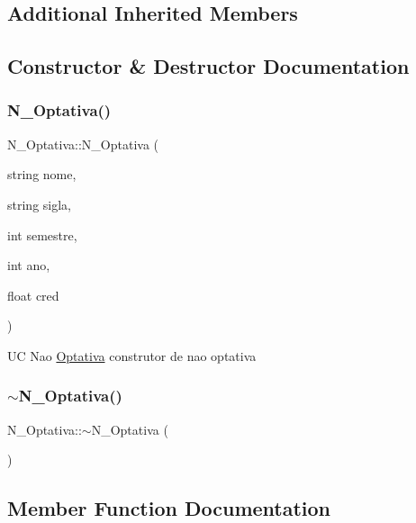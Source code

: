 \subsection*{Additional Inherited Members}


\subsection{Constructor \& Destructor Documentation}
\hypertarget{class_n___optativa_a9c0103c5330eaaebeb37a5236014345c}{}\label{class_n___optativa_a9c0103c5330eaaebeb37a5236014345c} 
\subsubsection{\texorpdfstring{N\+\_\+\+Optativa()}{N\_Optativa()}}
{\footnotesize\ttfamily N\+\_\+\+Optativa\+::\+N\+\_\+\+Optativa (\begin{DoxyParamCaption}\item[{string}]{nome,  }\item[{string}]{sigla,  }\item[{int}]{semestre,  }\item[{int}]{ano,  }\item[{float}]{cred }\end{DoxyParamCaption})}

UC Nao \hyperlink{class_optativa}{Optativa} construtor de nao optativa \hypertarget{class_n___optativa_a9cdbfb651fba33a1716e022c38e15d62}{}\label{class_n___optativa_a9cdbfb651fba33a1716e022c38e15d62} 
\subsubsection{\texorpdfstring{$\sim$\+N\+\_\+\+Optativa()}{~N\_Optativa()}}
{\footnotesize\ttfamily N\+\_\+\+Optativa\+::$\sim$\+N\+\_\+\+Optativa (\begin{DoxyParamCaption}{ }\end{DoxyParamCaption})\hspace{0.3cm}{\ttfamily [inline]}}



\subsection{Member Function Documentation}
\hypertarget{class_n___optativa_a11190901ff62b2d09903e81886d4cdd4}{}\label{class_n___optativa_a11190901ff62b2d09903e81886d4cdd4} 
